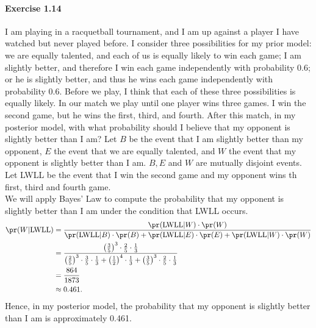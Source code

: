 \paragraph{Exercise 1.14} I am playing in a racquetball tournament, and I am up
against a player I have watched but never played before. I consider three
possibilities for my prior model: we are equally talented, and each of us is equally
likely to win each game; I am slightly better, and therefore I win each game
independently with probability 0.6; or he is slightly better, and thus he wins
each game independently with probability 0.6. Before we play, I think that each
of these three possibilities is equally likely. In our match we play until one
player wins three games. I win the second game, but he wins the first, third, and
fourth. After this match, in my posterior model, with what probability should I
believe that my opponent is slightly better than I am?
Let $B$ be the event that I am slightly better than my opponent, $E$ the event that
we are equally talented, and $W$ the event that my opponent is slightly better than
I am. $B, E$ and $W$ are mutually disjoint events. Let LWLL be the event that I
win the second game and my opponent wins th first, third and fourth game. \\
We will apply Bayes' Law to compute the probability that my opponent is slightly
better than I am under the condition that LWLL occurs.
\begin{align*}
  \pr(W|\text{LWLL})
    &= \frac{\pr(\text{LWLL}|W) \cdot \pr(W)}{\pr(\text{LWLL}|B) \cdot \pr(B) + \pr(\text{LWLL}|E) \cdot \pr(E) + \pr(\text{LWLL}|W) \cdot \pr(W)} \\
    &= \frac{\left(\frac{3}{5}\right)^3 \cdot \frac{2}{5} \cdot \frac{1}{3}} {\left( \frac{2}{5} \right)^3 \cdot \frac{3}{5} \cdot \frac{1}{3} + \left( \frac{1}{2} \right) ^4 \cdot \frac{1}{3} + \left(\frac{3}{5}\right)^3 \cdot \frac{2}{5} \cdot \frac{1}{3}} \\
    &= \frac{864}{1873} \\
    &\approx 0.461.
\end{align*}
Hence, in my posterior model, the probability that my opponent is slightly better
than I am is approximately 0.461.

